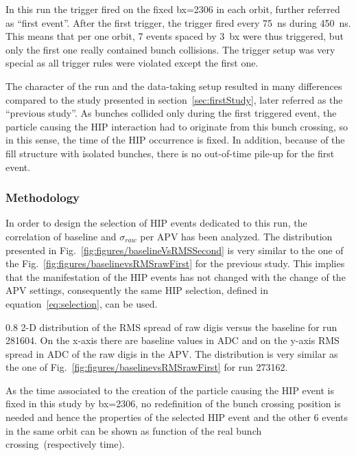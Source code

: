 In this run the trigger fired on the fixed bx=2306 in each orbit, further referred as ``first event''. After the first trigger, the trigger fired every 75~ns during 450~ns. This means that per one orbit, 7 events spaced by 3~bx were thus triggered, but only the first one really contained bunch collisions. The trigger setup was very special as all trigger rules were violated except the first one.


The character of the run and  the data-taking setup resulted in many differences compared to the study presented in section~\ref{sec:firstStudy}, later referred as the ``previous study''. As bunches collided only during the first triggered event, the particle causing the HIP interaction had to originate from this bunch crossing, so in this sense, the time of the HIP occurrence is fixed. In addition, because of the fill structure with isolated bunches, there is no out-of-time pile-up for the first event.

\subsubsection{Methodology}

In order to design the selection of HIP events dedicated to this run, the correlation of baseline and $\sigma_{raw}$ per APV has been analyzed. The distribution presented in Fig.~\ref{fig:figures/baselineVsRMSSecond} is very similar to the one of the Fig.~\ref{fig:figures/baselinevsRMSrawFirst} for the previous study. This implies that the manifestation of the HIP events has not changed with the change of the APV settings, consequently the same HIP selection, defined in equation~\ref{eq:selection}, can be used.

                 {0.8}       %
                 {2-D distribution of the RMS spread of raw digis versus the baseline for run 281604. On the x-axis there are baseline values in ADC and on the y-axis RMS spread in ADC of the raw digis in the APV. The distribution is very similar as the one of Fig.~\ref{fig:figures/baselinevsRMSrawFirst} for run 273162. } %

As the time associated to the creation of the particle causing the HIP event is fixed in this study by bx=2306, no redefinition of the bunch crossing position is needed and hence the properties of the selected HIP event and the other 6 events in the same orbit can be shown as function of the real bunch crossing~(respectively time).

